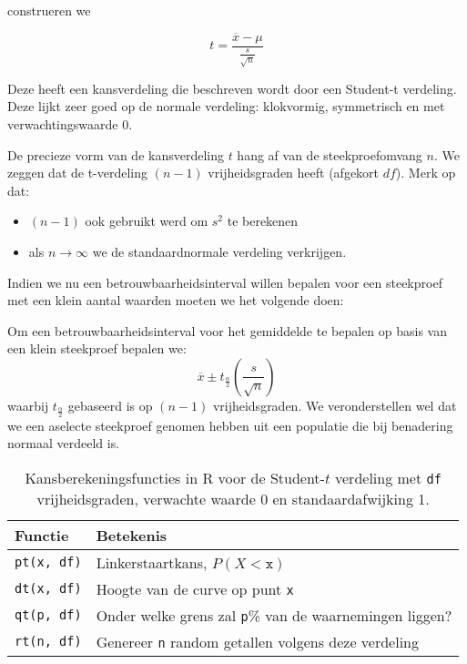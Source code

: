 construeren we

\[ t = \frac{\overline{x} - \mu}{\frac{s}{\sqrt{n}}} \]

Deze heeft een kansverdeling die beschreven wordt door een Student-t verdeling. Deze lijkt zeer goed op de normale verdeling: klokvormig, symmetrisch en met verwachtingswaarde 0.

De precieze vorm van de kansverdeling $t$ hang af van de steekproefomvang $n$. We zeggen dat de t-verdeling $(n-1)$ vrijheidsgraden heeft (afgekort $df$).
Merk op dat:
\begin{itemize}
  \item $(n-1)$ ook gebruikt werd om $s^{2}$ te berekenen
  \item als $n \rightarrow \infty$ we de standaardnormale verdeling verkrijgen.
\end{itemize}

Indien we nu een betrouwbaarheidsinterval willen bepalen voor een steekproef met een klein aantal waarden moeten we het volgende doen:

\begin{definition}
  Om een betrouwbaarheidsinterval voor het gemiddelde te bepalen op basis van een klein steekproef bepalen we:
  \[ \overline{x} \pm t_{\frac{\alpha}{2}}(\frac{s}{\sqrt{n}}) \]
  waarbij $t_{\frac{\alpha}{2}}$ gebaseerd is op $(n-1)$ vrijheidsgraden. We veronderstellen wel dat we een aselecte steekproef genomen hebben uit
  een populatie die bij benadering normaal verdeeld is.
\end{definition}

\begin{table}
  \centering
  \begin{tabular}{ll}
  	\textbf{Functie} & \textbf{Betekenis}                                             \\ \midrule
  	\verb|pt(x, df)| & Linkerstaartkans, $P(X<\mathtt{x})$                            \\
  	\verb|dt(x, df)| & Hoogte van de curve op punt \texttt{x}                         \\
  	\verb|qt(p, df)| & Onder welke grens zal \texttt{p}\% van de waarnemingen liggen? \\
  	\verb|rt(n, df)| & Genereer \texttt{n} random getallen volgens deze verdeling
  \end{tabular}

  \caption{Kansberekeningsfuncties in R voor de Student-$t$ verdeling met \texttt{df} vrijheidsgraden, verwachte waarde 0 en standaardafwijking 1.}
  \label{tab:t-prob-r}
\end{table}

